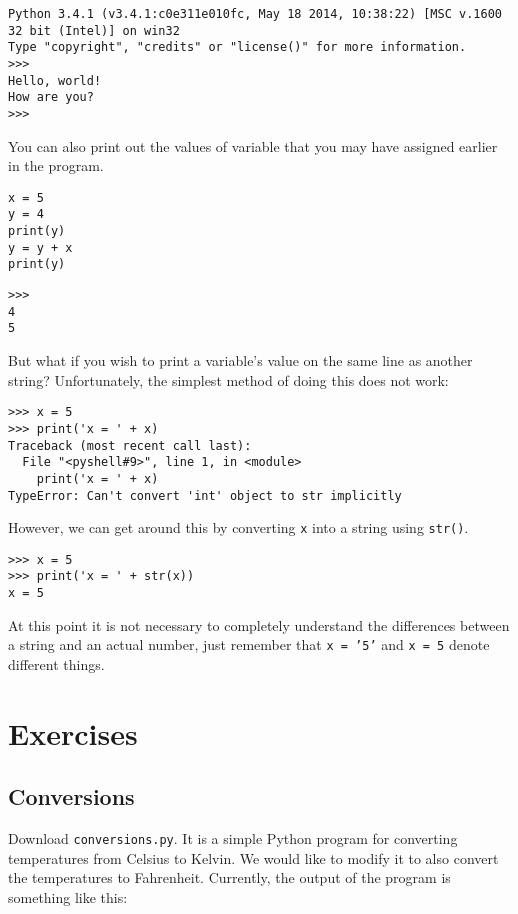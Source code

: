 \documentclass[12pt,hidelinks]{article}
\begin{document}
\begin{lstlisting}[style=bash]
Python 3.4.1 (v3.4.1:c0e311e010fc, May 18 2014, 10:38:22) [MSC v.1600 32 bit (Intel)] on win32
Type "copyright", "credits" or "license()" for more information.
>>> 
Hello, world!
How are you?
>>> 
\end{lstlisting}

You can also print out the values of variable that you may have assigned earlier in the program.

\begin{lstlisting}[style=python]
x = 5
y = 4
print(y)
y = y + x
print(y)
\end{lstlisting}

\begin{lstlisting}[style=bash]
>>> 
4
5
\end{lstlisting}

But what if you wish to print a variable's value on the same line as another string? Unfortunately, the simplest method of doing this does not work:

\begin{lstlisting}[style=bash]
>>> x = 5
>>> print('x = ' + x)
Traceback (most recent call last):
  File "<pyshell#9>", line 1, in <module>
    print('x = ' + x)
TypeError: Can't convert 'int' object to str implicitly
\end{lstlisting}

However, we can get around this by converting \texttt{x} into a string using \texttt{str()}.

\begin{lstlisting}[style=bash]
>>> x = 5
>>> print('x = ' + str(x))
x = 5
\end{lstlisting}

At this point it is not necessary to completely understand the differences between a string and an actual number, just remember that \texttt{x = '5'} and \texttt{x = 5} denote different things.

\pagebreak

\section{Exercises}
\subsection{Conversions}
Download \texttt{conversions.py}. It is a simple Python program for converting temperatures from Celsius to Kelvin. We would like to modify it to also convert the temperatures to Fahrenheit. Currently, the output of the program is something like this:
\end{document}
